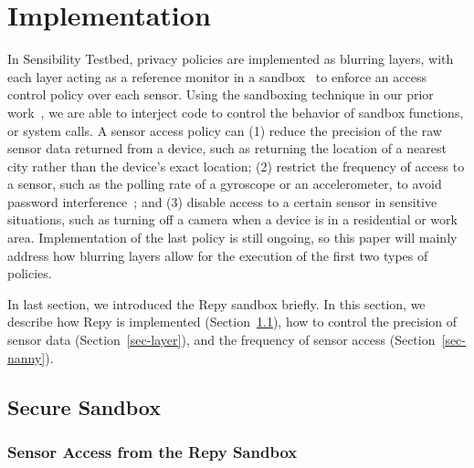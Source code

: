 \section{Implementation}\label{sec-policy}

In Sensibility Testbed, privacy policies are implemented as blurring layers, with each layer acting as a 
reference monitor in a sandbox~\cite{ref} to enforce an access 
control policy over each sensor. Using the sandboxing 
technique in our prior work~\cite{cappos2010retaining}, we are able to
interject code to control the behavior of sandbox functions, or 
system calls. A sensor access policy can (1) reduce 
the precision of the raw sensor data returned from a device, such
as returning the location of a nearest city rather than the device's exact location; (2) restrict 
the frequency of access to a sensor, such as the polling rate of a gyroscope or
an accelerometer, to avoid password interference~\cite{michalevsky2014gyrophone}; and (3) disable  
access to a certain sensor in sensitive situations, such as 
turning off a camera when a device is in a residential or work area.
Implementation of the last policy is still ongoing, so this paper will mainly address
how blurring layers allow for the execution of the first two types of policies. 

In last section, we introduced the Repy sandbox briefly. 
In this section, we describe how Repy is implemented
(Section~\ref{sec-repy-ext}), 
how to control the precision of sensor data (Section~\ref{sec-layer}), 
and the frequency of sensor access (Section~\ref{sec-nanny}).

\subsection{Secure Sandbox}\label{sec-repy-ext}



\subsubsection{Sensor Access from the Repy Sandbox}

